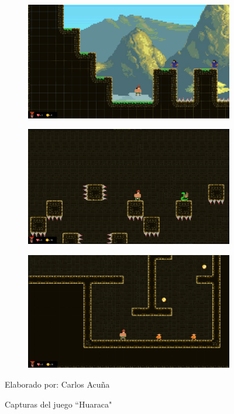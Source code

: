 \documentclass[a4paper, openright, 12pt]{report}
\begin{document}
\begin{figure}[h!]
\begin{subfigure}[b]{0.3\linewidth}
  \end{subfigure}
  \begin{subfigure}[b]{0.3\linewidth}
    \includegraphics[width=\linewidth]{T19_01}
  \end{subfigure}
  \begin{subfigure}[b]{0.3\linewidth}
    \includegraphics[width=\linewidth]{T20_01}
  \end{subfigure}
  \begin{subfigure}[b]{0.3\linewidth}
    \includegraphics[width=\linewidth]{T21_01}
  \end{subfigure}
  \caption{Capturas del juego ``Huaraca"}
Elaborado por: Carlos Acuña
\label{fig:unity10}
\end{figure}
\clearpage
\end{document}
